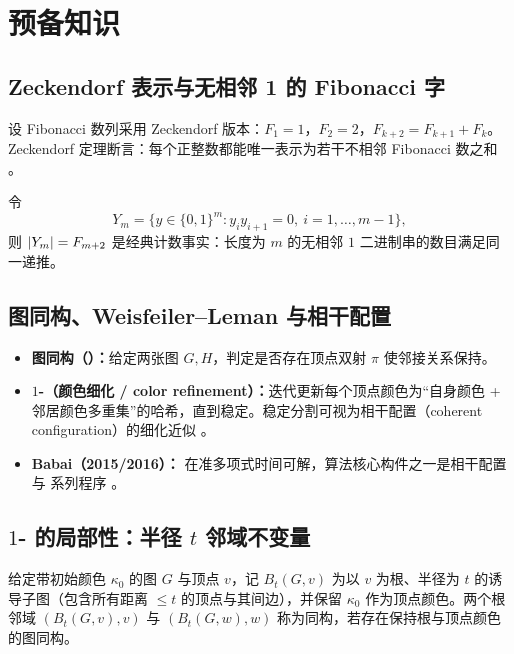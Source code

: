 
\section{预备知识}

\subsection{Zeckendorf 表示与无相邻 1 的 Fibonacci 字}

设 Fibonacci 数列采用 Zeckendorf 版本：$F_1=1$，$F_2=2$，$F_{k+2}=F_{k+1}+F_k$。Zeckendorf 定理断言：每个正整数都能唯一表示为若干不相邻 Fibonacci 数之和 \cite{zeckendorf1972representation}。

令
\[
Y_m=\bigl\{y\in\{0,1\}^{m}: y_i y_{i+1}=0,\ i=1,\dots,m-1\bigr\},
\]
则 $\left\lvert Y_m\right\rvert=F_{m+2}$ 是经典计数事实：长度为 $m$ 的无相邻 $1$ 二进制串的数目满足同一递推。

\subsection{图同构、Weisfeiler--Leman 与相干配置}

\begin{itemize}
  \item \textbf{图同构（\GI{}）：}给定两张图 $G,H$，判定是否存在顶点双射 $\pi$ 使邻接关系保持。
  \item \textbf{$1$-\WL{}（颜色细化 / color refinement）：}迭代更新每个顶点颜色为“自身颜色 + 邻居颜色多重集”的哈希，直到稳定。稳定分割可视为相干配置（coherent configuration）的细化近似 \cite{wl2018symmetryvsregularity}。
  \item \textbf{Babai（2015/2016）：}\GI{} 在准多项式时间可解，算法核心构件之一是相干配置与 \WL{} 系列程序 \cite{babai2016gi}。
\end{itemize}

\subsection{\texorpdfstring{$1$-\WL{}}{1-WL} 的局部性：半径 \texorpdfstring{$t$}{t} 邻域不变量}

\begin{definition}[带初始颜色的根邻域]
给定带初始颜色 $\kappa_0$ 的图 $G$ 与顶点 $v$，记 $B_t(G,v)$ 为以 $v$ 为根、半径为 $t$ 的诱导子图（包含所有距离 $\le t$ 的顶点与其间边），并保留 $\kappa_0$ 作为顶点颜色。两个根邻域 $(B_t(G,v),v)$ 与 $(B_t(G,w),w)$ 称为同构，若存在保持根与顶点颜色的图同构。
\end{definition}

